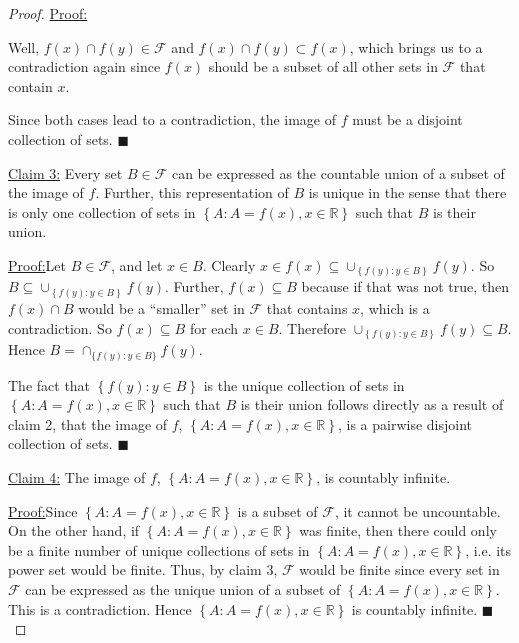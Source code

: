 \documentclass[12pt]{article}
\newenvironment{claimproof}[1]{\par\noindent\underline{Proof:}\space#1}{\hfill $\blacksquare$}
\begin{document}
\begin{proof}
\begin{claimproof}
\begin{itemize}[label={},leftmargin=4mm, itemsep=1em, parsep=1em]
Well, $f(x) \cap f(y) \in \mathcal{F}$ and $f(x) \cap f(y) \subset f(x)$, which brings us to a contradiction again since $f(x)$ should be a subset of
all other sets in $\mathcal{F}$ that contain $x$.
\end{itemize}
Since both cases lead to a contradiction, the image of $f$ must be a disjoint collection of sets.
\end{claimproof}

\underline{Claim 3:} Every set $B \in \mathcal{F}$ can be expressed as the countable union of a subset of the image of $f$. Further, this
representation of $B$ is unique in the sense that there is only one collection of sets in $\left\{ A : A = f(x), x \in \mathbb{R} \right\}$ such that
$B$ is their union.

\begin{claimproof}
Let $B \in \mathcal{F}$, and let $x \in B$. Clearly $x \in f(x) \subseteq \cup_{\left\{ f(y) : y \in B \right\}}f(y)$. So $B \subseteq \cup_{\left\{
f(y) : y \in B \right\}}f(y)$. Further, $f(x) \subseteq B$ because if that was not true, then $f(x) \cap B$ would be a ``smaller'' set in
$\mathcal{F}$ that contains $x$, which is a contradiction. So $f(x) \subseteq B$ for each $x \in B$. Therefore $\cup_{\left\{f(y) : y \in B
\right\}}f(y) \subseteq B$. Hence $B = \cap_{\{f(y) : y \in B\}}f(y)$.

The fact that $\left\{ f(y) : y \in B \right\}$ is the unique collection of sets in $\left\{ A : A = f(x), x \in \mathbb{R} \right\}$ such that 
$B$ is their union follows directly as a
result of claim 2, that the image of $f$, $\left\{ A : A = f(x), x \in \mathbb{R} \right\}$, is a pairwise disjoint collection of sets.
\end{claimproof}

\underline{Claim 4:} The image of $f$, $\left\{ A : A = f(x), x \in \mathbb{R} \right\}$, is countably infinite.

\begin{claimproof}
Since $\left\{ A : A = f(x), x \in \mathbb{R} \right\}$ is a subset of $\mathcal{F}$, it cannot be uncountable. On the other hand, if $\left\{ A : A = f(x), x \in \mathbb{R} \right\}$
was finite, then there could only be a finite number of unique collections of sets in $\left\{ A : A = f(x), x \in \mathbb{R} \right\}$, i.e. its power
set would be finite. Thus, by claim 3, $\mathcal{F}$ would be finite since every set in $\mathcal{F}$ can be expressed as the unique union of a subset
of $\left\{ A : A = f(x), x \in \mathbb{R} \right\}$. This is a contradiction. Hence $\left\{ A : A = f(x), x \in \mathbb{R} \right\}$ is countably infinite.
\end{claimproof}


\end{proof}
\end{document}
